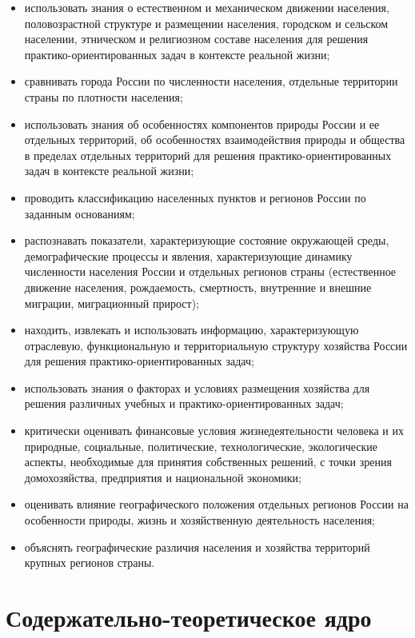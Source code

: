 \documentclass[
  11pt,
  russian,
]{book}
\begin{document}
\begin{itemize}
\item
  использовать знания о естественном и механическом движении населения, половозрастной структуре и размещении населения, городском и сельском населении, этническом и религиозном составе населения для решения практико-ориентированных задач в контексте реальной жизни;
\item
  сравнивать города России по численности населения, отдельные территории страны по плотности населения;
\item
  использовать знания об особенностях компонентов природы России и ее отдельных территорий, об особенностях взаимодействия природы и общества в пределах отдельных территорий для решения практико-ориентированных задач в контексте реальной жизни;
\item
  проводить классификацию населенных пунктов и регионов России по заданным основаниям;
\item
  распознавать показатели, характеризующие состояние окружающей среды, демографические процессы и явления, характеризующие динамику численности населения России и отдельных регионов страны (естественное движение населения, рождаемость, смертность, внутренние и внешние миграции, миграционный прирост);
\item
  находить, извлекать и использовать информацию, характеризующую отраслевую, функциональную и территориальную структуру хозяйства России для решения практико-ориентированных задач;
\item
  использовать знания о факторах и условиях размещения хозяйства для решения различных учебных и практико-ориентированных задач;
\item
  критически оценивать финансовые условия жизнедеятельности человека и их природные, социальные, политические, технологические, экологические аспекты, необходимые для принятия собственных решений, с точки зрения домохозяйства, предприятия и национальной экономики;
\item
  оценивать влияние географического положения отдельных регионов России на особенности природы, жизнь и хозяйственную деятельность населения;
\item
  объяснять географические различия населения и хозяйства территорий крупных регионов страны.
\end{itemize}

\hypertarget{ux441ux43eux434ux435ux440ux436ux430ux442ux435ux43bux44cux43dux43e-ux442ux435ux43eux440ux435ux442ux438ux447ux435ux441ux43aux43eux435-ux44fux434ux440ux43e}{%
\section*{Содержательно-теоретическое ядро}\label{ux441ux43eux434ux435ux440ux436ux430ux442ux435ux43bux44cux43dux43e-ux442ux435ux43eux440ux435ux442ux438ux447ux435ux441ux43aux43eux435-ux44fux434ux440ux43e}}
\end{document}
